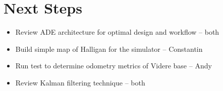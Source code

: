 \documentclass[12pt]{article}
\begin{document}
\section{Next Steps}

\begin{itemize}
    \setlength{\itemsep}{0pt}
    \setlength{\parskip}{0pt}
    \setlength{\parsep}{0pt}
    \item Review ADE architecture for optimal design and workflow -- both
    \item Build simple map of Halligan for the simulator -- Constantin
    \item Run test to determine odometry metrics of Videre base  -- Andy
    \item Review Kalman filtering technique -- both
\end{itemize}
\end{document}
